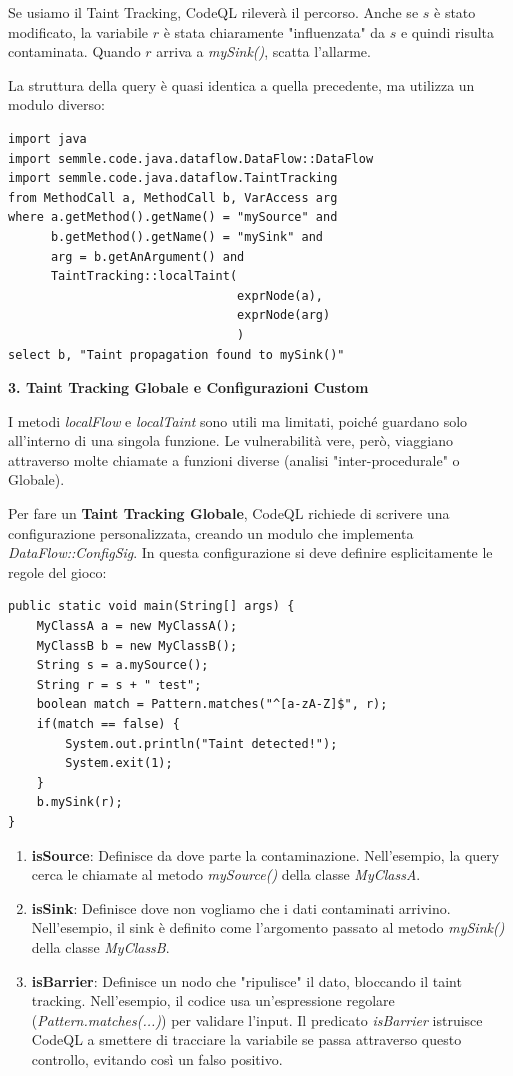 Se usiamo il Taint Tracking, CodeQL rileverà il percorso. Anche se $s$ è stato 
modificato, la variabile $r$ è stata chiaramente "influenzata" da $s$ e quindi 
risulta contaminata. Quando $r$ arriva a \textit{mySink()}, scatta l'allarme.

La struttura della query è quasi identica a quella precedente, ma utilizza un modulo diverso:

\begin{lstlisting}
import java
import semmle.code.java.dataflow.DataFlow::DataFlow
import semmle.code.java.dataflow.TaintTracking
from MethodCall a, MethodCall b, VarAccess arg
where a.getMethod().getName() = "mySource" and
      b.getMethod().getName() = "mySink" and
      arg = b.getAnArgument() and
      TaintTracking::localTaint(
                                exprNode(a),
                                exprNode(arg)
                                )
select b, "Taint propagation found to mySink()"
\end{lstlisting}

\textbf{3. Taint Tracking Globale e Configurazioni Custom}

I metodi \textit{localFlow} e \textit{localTaint} sono utili ma limitati, poiché 
guardano solo all'interno di una singola funzione. Le vulnerabilità vere, però, 
viaggiano attraverso molte chiamate a funzioni diverse (analisi "inter-procedurale" 
o Globale).

Per fare un \textbf{Taint Tracking Globale}, CodeQL richiede di scrivere una 
configurazione personalizzata, creando un modulo che implementa \textit{DataFlow::ConfigSig}. 
In questa configurazione si deve definire esplicitamente le regole del gioco:

\begin{lstlisting}
public static void main(String[] args) {
    MyClassA a = new MyClassA();
    MyClassB b = new MyClassB();
    String s = a.mySource();
    String r = s + " test";
    boolean match = Pattern.matches("^[a-zA-Z]$", r);
    if(match == false) {
        System.out.println("Taint detected!");
        System.exit(1);
    }
    b.mySink(r);
}
\end{lstlisting}

\begin{enumerate}
    \item \textbf{isSource}: Definisce da dove parte la contaminazione. Nell'esempio, 
    la query cerca le chiamate al metodo \textit{mySource()} della classe \textit{MyClassA}.
    \item \textbf{isSink}: Definisce dove non vogliamo che i dati contaminati arrivino.
    Nell'esempio, il sink è definito come l'argomento passato al metodo \textit{mySink()} 
    della classe \textit{MyClassB}.
    \item \textbf{isBarrier}: Definisce un nodo che "ripulisce" il dato, bloccando 
    il taint tracking. Nell'esempio, il codice usa un'espressione regolare (\textit{Pattern.matches(...)}) 
    per validare l'input. Il predicato \textit{isBarrier} istruisce CodeQL a smettere 
    di tracciare la variabile se passa attraverso questo controllo, evitando così un 
    falso positivo.
\end{enumerate}

